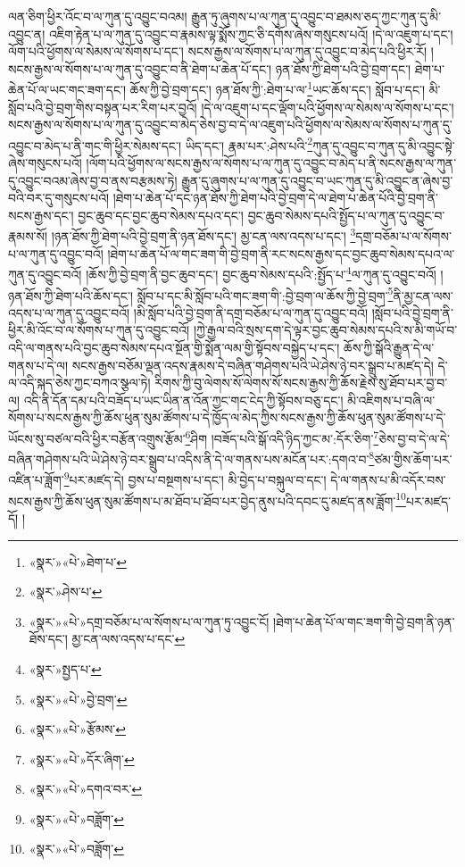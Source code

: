 ལན་ཅིག་ཕྱིར་འོང་བ་ལ་ཀུན་དུ་འབྱུང་བའམ། རྒྱུན་ཏུ་ཞུགས་པ་ལ་ཀུན་དུ་འབྱུང་བ་ཐམས་ཅད་ཀྱང་ཀུན་དུ་མི་འབྱུང་ན། འཇིག་རྟེན་པ་ལ་ཀུན་དུ་འབྱུང་བ་རྣམས་ལྟ་སྨོས་ཀྱང་ཅི་དགོས་ཞེས་གསུངས་པའོ། །དེ་ལ་འཇུག་པ་དང་། ལོག་པའི་ཕྱོགས་ལ་སེམས་ལ་སོགས་པ་དང་། སངས་རྒྱས་ལ་སོགས་པ་ལ་ཀུན་དུ་འབྱུང་བ་མེད་པའི་ཕྱིར་རོ། །སངས་རྒྱས་ལ་སོགས་པ་ལ་ཀུན་དུ་འབྱུང་བ་ནི་ཐེག་པ་ཆེན་པོ་དང་། ཉན་ཐོས་ཀྱི་ཐེག་པའི་བྱེ་བྲག་དང་། ཐེག་པ་ཆེན་པོ་ལ་ཡང་གང་ཟག་དང་། ཆོས་ཀྱི་བྱེ་བྲག་དང་། ཉན་ཐོས་ཀྱི་:ཐེག་པ་ལ་\footnote{«སྣར་»«པེ་»ཐེག་པ་}ཡང་ཆོས་དང་། སློབ་པ་དང་། མི་སློབ་པའི་བྱེ་བྲག་གིས་བསྟན་པར་རིག་པར་བྱའོ། །དེ་ལ་འཇུག་པ་དང་ལྡོག་པའི་ཕྱོགས་ལ་སེམས་ལ་སོགས་པ་དང་། སངས་རྒྱས་ལ་སོགས་པ་ལ་ཀུན་དུ་འབྱུང་བ་མེད་ཅེས་བྱ་བ་དེ་ལ་འཇུག་པའི་ཕྱོགས་ལ་སེམས་ལ་སོགས་པ་ཀུན་དུ་འབྱུང་བ་མེད་པ་ནི་གང་གི་ཕྱིར་སེམས་དང་། ཡིད་དང་། རྣམ་པར་:ཤེས་པའི་\footnote{«སྣར་»ཤེས་པ་}ཀུན་དུ་འབྱུང་བ་ཀུན་དུ་མི་འབྱུང་སྟེ་ཞེས་གསུངས་པའོ། །ལོག་པའི་ཕྱོགས་ལ་སངས་རྒྱས་ལ་སོགས་པ་ལ་ཀུན་དུ་འབྱུང་བ་མེད་པ་ནི་སངས་རྒྱས་ལ་ཀུན་དུ་འབྱུང་བའམ་ཞེས་བྱ་བ་ནས་བརྩམས་ཏེ། རྒྱུན་དུ་ཞུགས་པ་ལ་ཀུན་དུ་འབྱུང་བ་ཡང་ཀུན་དུ་མི་འབྱུང་ན་ཞེས་བྱ་བའི་བར་དུ་གསུངས་པའོ། །ཐེག་པ་ཆེན་པོ་དང་ཉན་ཐོས་ཀྱི་ཐེག་པའི་བྱེ་བྲག་དེ་ལ་ཐེག་པ་ཆེན་པོའི་བྱེ་བྲག་ནི་སངས་རྒྱས་དང་། བྱང་ཆུབ་དང་བྱང་ཆུབ་སེམས་དཔའ་དང་། བྱང་ཆུབ་སེམས་དཔའི་སྤྱོད་པ་ལ་ཀུན་དུ་འབྱུང་བ་རྣམས་སོ། །ཉན་ཐོས་ཀྱི་ཐེག་པའི་བྱེ་བྲག་ནི་ཉན་ཐོས་དང་། མྱ་ངན་ལས་འདས་པ་དང་། \footnote{«སྣར་»«པེ་»དགྲ་བཅོམ་པ་ལ་སོགས་པ་ལ་ཀུན་ཏུ་འབྱུང་ངོ། །ཐེག་པ་ཆེན་པོ་ལ་གང་ཟག་གི་བྱེ་བྲག་ནི་ཉན་ཐོས་དང་། མྱ་ངན་ལས་འདས་པ་དང་}དགྲ་བཅོམ་པ་ལ་སོགས་པ་ལ་ཀུན་དུ་འབྱུང་བའོ། །ཐེག་པ་ཆེན་པོ་ལ་གང་ཟག་གི་བྱེ་བྲག་ནི་རང་སངས་རྒྱས་དང་བྱང་ཆུབ་སེམས་དཔའ་ལ་ཀུན་དུ་འབྱུང་བའོ། །ཆོས་ཀྱི་བྱེ་བྲག་ནི་བྱང་ཆུབ་དང་། བྱང་ཆུབ་སེམས་དཔའི་:སྤྱོད་པ་\footnote{«སྣར་»སྤྱད་པ་}ལ་ཀུན་དུ་འབྱུང་བའོ། །ཉན་ཐོས་ཀྱི་ཐེག་པའི་ཆོས་དང་། སློབ་པ་དང་མི་སློབ་པའི་གང་ཟག་གི་:བྱེ་བྲག་ལ་ཆོས་ཀྱི་བྱེ་བྲག་\footnote{«སྣར་»«པེ་»བྱེ་བྲག་}ནི་མྱ་ངན་ལས་འདས་པ་ལ་ཀུན་དུ་འབྱུང་བའོ། །མི་སློབ་པའི་བྱེ་བྲག་ནི་དགྲ་བཅོམ་པ་ལ་ཀུན་དུ་འབྱུང་བའོ། །སློབ་པའི་བྱེ་བྲག་ནི་ཕྱིར་མི་འོང་བ་ལ་སོགས་པ་ཀུན་དུ་འབྱུང་བའོ། །ཀྱེ་རྒྱལ་བའི་སྲས་དག་དེ་ལྟར་བྱང་ཆུབ་སེམས་དཔའི་ས་མི་གཡོ་བ་འདི་ལ་གནས་པའི་བྱང་ཆུབ་སེམས་དཔའ་སྔོན་གྱི་སྨོན་ལམ་གྱི་སྟོབས་བསྐྱེད་པ་དང་། ཆོས་ཀྱི་སྒོའི་རྒྱུན་དེ་ལ་གནས་པ་དེ་ལ། སངས་རྒྱས་བཅོམ་ལྡན་འདས་རྣམས་དེ་བཞིན་གཤེགས་པའི་ཡེ་ཤེས་ཉེ་བར་སྒྲུབ་པ་མཛད་དེ། དེ་ལ་འདི་སྐད་ཅེས་ཀྱང་བཀའ་སྩལ་ཏེ། རིགས་ཀྱི་བུ་ལེགས་སོ་ལེགས་སོ་སངས་རྒྱས་ཀྱི་ཆོས་རྗེས་སུ་ཐོབ་པར་བྱ་བ་ལ། འདི་ནི་དོན་དམ་པའི་བཟོད་པ་ཡང་ཡིན་ན་འོན་ཀྱང་གང་ངེད་ཀྱི་སྟོབས་བཅུ་དང་། མི་འཇིགས་པ་བཞི་ལ་སོགས་པ་སངས་རྒྱས་ཀྱི་ཆོས་ཕུན་སུམ་ཚོགས་པ་དེ་ཁྱོད་ལ་མེད་ཀྱིས་སངས་རྒྱས་ཀྱི་ཆོས་ཕུན་སུམ་ཚོགས་པ་དེ་ཡོངས་སུ་བཙལ་བའི་ཕྱིར་བརྩོན་འགྲུས་རྩོམ་\footnote{«སྣར་»«པེ་»རྩོམས་}ཤིག །བཟོད་པའི་སྒོ་འདི་ཉིད་ཀྱང་མ་:དོར་ཅིག་\footnote{«སྣར་»«པེ་»དོར་ཞིག་}ཅེས་བྱ་བ་དེ་ལ་དེ་བཞིན་གཤེགས་པའི་ཡེ་ཤེས་ཉེ་བར་སྒྲུབ་པ་འདིས་ནི་དེ་ལ་གནས་པས་མངོན་པར་:དགའ་བ་\footnote{«སྣར་»«པེ་»དགའ་བར་}ཙམ་གྱིས་ཆོག་པར་འཛིན་པ་ཟློག་\footnote{«སྣར་»«པེ་»བཟློག་}པར་མཛད་དེ། བྱས་པ་བསྔགས་པ་དང་། མི་བྱེད་པ་བསྐུལ་བ་དང་། དེ་ལ་གནས་པ་མི་འདོར་བས་སངས་རྒྱས་ཀྱི་ཆོས་ཕུན་སུམ་ཚོགས་པ་མ་ཐོབ་པ་ཐོབ་པར་བྱེད་ནུས་པའི་དབང་དུ་མཛད་ནས་ཟློག་\footnote{«སྣར་»«པེ་»བཟློག་}པར་མཛད་དོ། །
